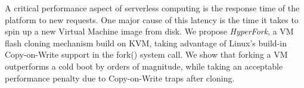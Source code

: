 
A critical performance aspect of serverless computing is the response time of the platform to new requests. One major cause of this latency is the time it takes to spin up a new Virtual Machine image from disk. We propose \emph{HyperFork}, a VM flash cloning mechanism build on KVM, taking advantage of Linux's build-in Copy-on-Write support in the fork() system call. We show that forking a VM outperforms a cold boot by orders of magnitude, while taking an acceptable performance penalty due to Copy-on-Write traps after cloning.
